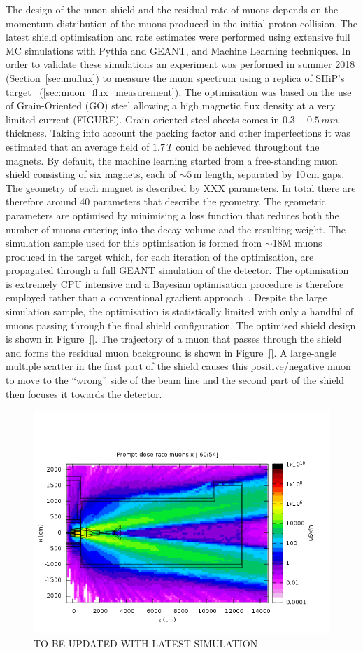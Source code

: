 \documentclass{article}
\begin{document}
The design of the muon shield and the residual rate of muons depends on the momentum 
distribution of the muons produced in the initial proton collision. The latest shield 
optimisation and rate estimates were performed using extensive full MC simulations with 
Pythia and GEANT, and Machine Learning techniques. In order to validate these 
simulations an experiment was performed in summer 2018 (Section~\ref{sec:muflux}) 
to measure the muon spectrum using a replica of SHiP's target~\cite{SHiP-EOI-016} 
(\ref{sec:muon_flux_measurement}). The optimisation was based on the use of Grain-Oriented (GO) steel allowing 
a high magnetic flux density at a very limited current (FIGURE). Grain-oriented steel 
sheets comes in $0.3 - 0.5\,mm$ thickness. Taking into account the packing factor 
and other imperfections it was estimated that an average field of $1.7\,T$ could be 
achieved throughout the magnets. By default, the machine learning started from a 
free-standing muon shield consisting of six magnets, each of $\sim 5\,$m length, separated 
by 10\,cm gaps. The geometry of each magnet is described by XXX parameters. In total there are therefore around 40 parameters that describe the geometry. 
The geometric parameters are optimised by minimising 
a loss function that reduces both the number of muons entering into the decay volume and the 
resulting weight. The simulation sample used for this optimisation is formed from $\sim$18M 
muons produced in the target which, for each iteration of the optimisation, are propagated 
through a full GEANT simulation of the detector. The optimisation is extremely CPU intensive 
and a Bayesian optimisation procedure is therefore employed rather than a conventional 
gradient approach~\cite{}. Despite the large simulation sample, the optimisation is 
statistically limited with only a handful of muons passing through the final shield 
configuration. The optimised shield design is shown in Figure~\ref{}. The trajectory of a 
muon that passes through the shield and forms the residual muon background is shown in Figure~\ref{}. A large-angle multiple scatter
in the first part of the shield causes this positive/negative muon to move to the ``wrong'' side
of the beam line and the second part of the shield then focuses it towards the detector.

\begin{figure}[tbh]
\centering
\includegraphics[width=0.7\columnwidth]{figs/2018_10_03_MuonFlux_FLUKA.png}
\caption{TO BE UPDATED WITH LATEST SIMULATION}
\label{fig:MuonShieldFluka}
\end{figure}
\end{document}

